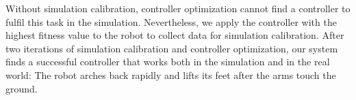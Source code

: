 Without simulation calibration, controller optimization cannot find a controller to fulfil this task in the simulation. Nevertheless, we apply the controller with the highest fitness value to the robot to collect data for simulation calibration. After two iterations of simulation calibration and controller optimization, our system finds a successful controller that works both in the simulation and in the real world: The robot arches back rapidly and lifts its feet after the arms touch the ground. 


